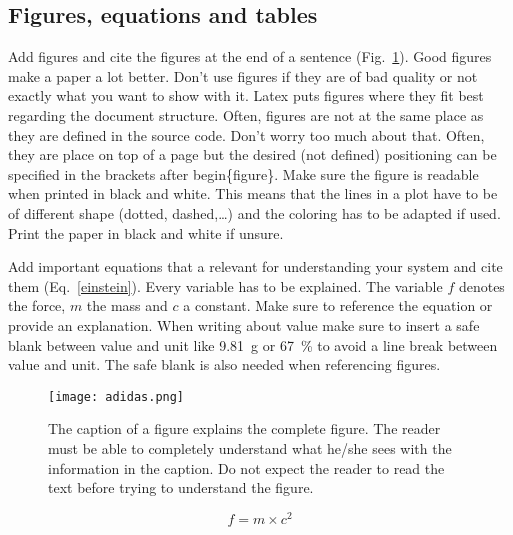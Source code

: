 \documentclass[conference]{IEEEtran}
\begin{document}
\subsection{Figures, equations and tables}
Add figures and cite the figures at the end of a sentence (Fig.~\ref{adidas}). Good figures make a paper a lot better. Don't use figures if they are of bad quality or not exactly what you want to show with it. Latex puts figures where they fit best regarding the document structure. Often, figures are not at the same place as they are defined in the source code. Don't worry too much about that. Often, they are place on top of a page but the desired (not defined) positioning can be specified in the brackets after begin\{figure\}. Make sure the figure is readable when printed in black and white. This means that the lines in a plot have to be of different shape (dotted, dashed,\dots) and the coloring has to be adapted if used. Print the paper in black and white if unsure.

Add important equations that a relevant for understanding your system and cite them (Eq.~\ref{einstein}). Every variable has to be explained. The variable $f$ denotes the force, $m$ the mass and $c$ a constant. Make sure to reference the equation or provide an explanation. When writing about value make sure to insert a safe blank between value and unit like 9.81~g or 67~\% to avoid a line break between value and unit. The safe blank is also needed when referencing figures.

\begin{figure}[t!]
\centering
\texttt{[image: adidas.png]}
\caption{The caption of a figure explains the complete figure. The reader must be able to completely understand what he/she sees with the information in the caption. Do not expect the reader to read the text before trying to understand the figure.}
\label{adidas}
\end{figure}

\begin{equation}
f = m \times c^2
\label{einstein}
\end{equation}
\end{document}
